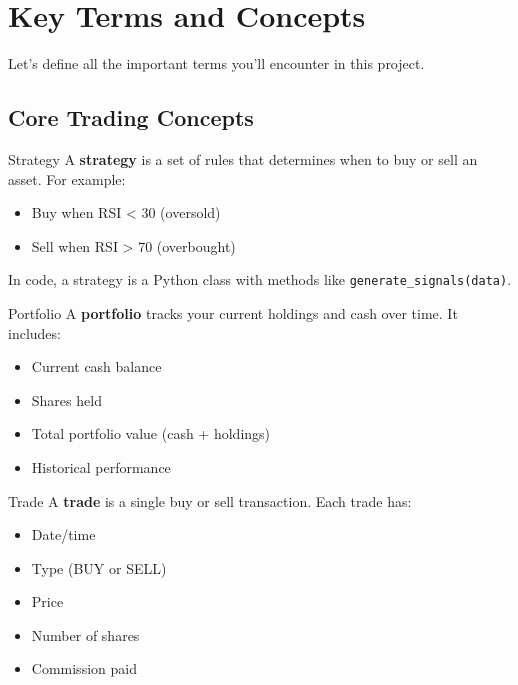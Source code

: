 \documentclass[11pt,a4paper]{article}
\begin{document}
\section{Key Terms and Concepts}

Let's define all the important terms you'll encounter in this project.

\subsection{Core Trading Concepts}

\begin{keyterm}{Strategy}
A \textbf{strategy} is a set of rules that determines when to buy or sell an asset. For example:
\begin{itemize}
  \item Buy when RSI < 30 (oversold)
  \item Sell when RSI > 70 (overbought)
\end{itemize}
In code, a strategy is a Python class with methods like \texttt{generate\_signals(data)}.
\end{keyterm}

\begin{keyterm}{Portfolio}
A \textbf{portfolio} tracks your current holdings and cash over time. It includes:
\begin{itemize}
  \item Current cash balance
  \item Shares held
  \item Total portfolio value (cash + holdings)
  \item Historical performance
\end{itemize}
\end{keyterm}

\begin{keyterm}{Trade}
A \textbf{trade} is a single buy or sell transaction. Each trade has:
\begin{itemize}
  \item Date/time
  \item Type (BUY or SELL)
  \item Price
  \item Number of shares
  \item Commission paid
\end{itemize}
\end{keyterm}
\end{document}

